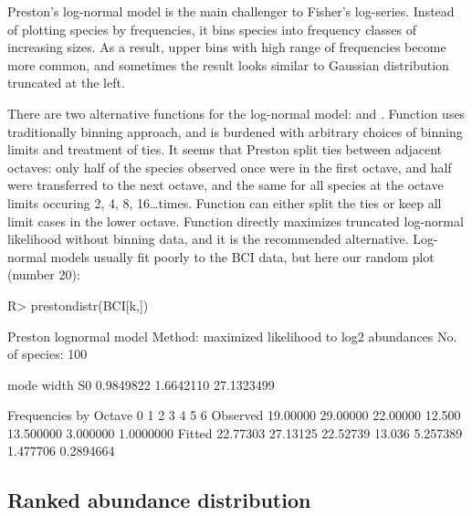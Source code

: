 \documentclass[article,nojss]{jss}
\begin{document}
Preston's log-normal model is the main challenger to Fisher's
log-series.  Instead of plotting species by frequencies, it bins
species into frequency classes of increasing sizes.  As a result,
upper bins with high range of frequencies become more common, and
sometimes the result looks similar to Gaussian distribution truncated
at the left.

There are two alternative functions for the log-normal model:
 and .  Function
 uses traditionally binning approach, and is burdened
with arbitrary choices of binning limits and treatment of ties. It
seems that Preston split ties between adjacent octaves: only half of
the species observed once were in the first octave, and half were
transferred to the next octave, and the same for all species at the
octave limits occuring 2, 4, 8, 16\ldots times. Function
 can either split the ties or keep all limit cases in
the lower octave.
Function  directly
maximizes truncated log-normal likelihood without binning data, and it
is the recommended alternative.  Log-normal models  usually fit poorly
to the BCI data, but here our random plot (number 20):
\begin{Schunk}
\begin{Sinput}
R> prestondistr(BCI[k,])
\end{Sinput}
\begin{Soutput}
Preston lognormal model
Method: maximized likelihood to log2 abundances 
No. of species: 100 

      mode      width         S0 
 0.9849822  1.6642110 27.1323499 

Frequencies by Octave
                0        1        2      3         4        5         6
Observed 19.00000 29.00000 22.00000 12.500 13.500000 3.000000 1.0000000
Fitted   22.77303 27.13125 22.52739 13.036  5.257389 1.477706 0.2894664
\end{Soutput}
\end{Schunk}

\subsection{Ranked abundance distribution}
\end{document}
